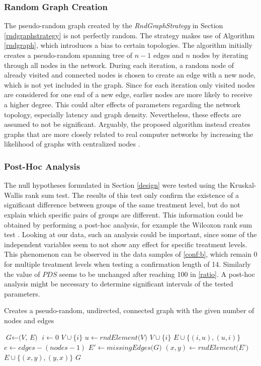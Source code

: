 \documentclass[a4paper,12pt,twoside]{report}
\begin{document}
\subsubsection{Random Graph Creation}
The pseudo-random graph created by the \textit{RndGraphStrategy} in Section \ref{rndgraphstrategy} is not perfectly random. The strategy makes use of Algorithm \ref{rndgraph}, which introduces a bias to certain topologies. The algorithm initially creates a pseudo-random spanning tree of $n-1$ edges and $n$ nodes by iterating through all nodes in the network. During each iteration, a random node of already visited and connected nodes is chosen to create an edge with a new node, which is not yet included in the graph. Since for each iteration only visited nodes are considered for one end of a new edge, earlier nodes are more likely to receive a higher degree. This could alter effects of parameters regarding the network topology, especially latency and graph density. Nevertheless, these effects are assumed to not be significant. Arguably, the proposed algorithm instead creates graphs that are more closely related to real computer networks by increasing the likelihood of graphs with centralized nodes \cite{stackoverflow}.
\subsubsection{Post-Hoc Analysis}
The null hypotheses formulated in Section \ref{design} were tested using the Kruskal-Wallis rank sum test. The results of this test only confirm the existence of a significant difference between groups of the same treatment level, but do not explain which specific pairs of groups are different. This information could be obtained by performing a post-hoc analysis, for example the Wilcoxon rank sum test \cite{wilcoxon}. Looking at our data, such an analysis could be important, since some of the independent variables seem to not show any effect for specific treatment levels. This phenomenon can be observed in the data samples of \autoref{conf:b}, which remain 0 for multiple treatment levels when testing a confirmation length of 14. Similarly the value of $PDS$ seems to be unchanged after reaching 100 in \autoref{ratio}. A post-hoc analysis might be necessary to determine significant intervals of the tested parameters.

\begin{algorithm}
\caption{Creates a pseudo-random, undirected, connected graph with the given number of nodes and edges}\label{rndgraph}
\begin{algorithmic}[1]
\State $\textit{G} \gets \textit{(V, E)}$
\State $i \gets 0$
\State $V \cup \{i \}$
\State $u \gets \textit{rndElement(V)}$
\State $V \cup \{i \}$
\State $E \cup \{(i,u),(u,i) \}$
\EndWhile
\State $e \gets edges - (nodes-1)$
\State $E' \gets \textit{missingEdges(G)}$
\State $(x,y) \gets \textit{rndElement(E')}$
\State $E \cup \{(x,y),(y,x) \}$
\EndWhile
\State \Return $G$
\EndProcedure
\end{algorithmic}
\end{algorithm}
\end{document}
